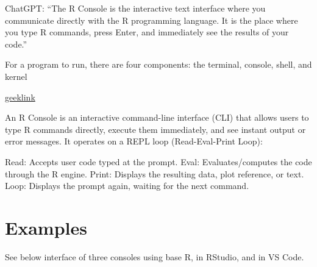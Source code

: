 \documentclass[
  letterpaper,
  DIV=11,
  numbers=noendperiod]{scrreprt}
\begin{document}

ChatGPT: ``The R Console is the interactive text interface where you
communicate directly with the R programming language. It is the place
where you type R commands, press Enter, and immediately see the results
of your code.''

For a program to run, there are four components: the terminal, console,
shell, and kernel

\href{https://www.geeksforgeeks.org/operating-systems/what-is-terminal-console-shell-and-kernel/}{geeklink}

An R Console is an interactive command-line interface (CLI) that allows
users to type R commands directly, execute them immediately, and see
instant output or error messages. It operates on a REPL loop
(Read-Eval-Print Loop):

Read: Accepts user code typed at the prompt. Eval: Evaluates/computes
the code through the R engine. Print: Displays the resulting data, plot
reference, or text. Loop: Displays the prompt again, waiting for the
next command.

\section*{Examples}\label{examples-24}


See below interface of three consoles using base R, in RStudio, and in
VS Code.
\end{document}
